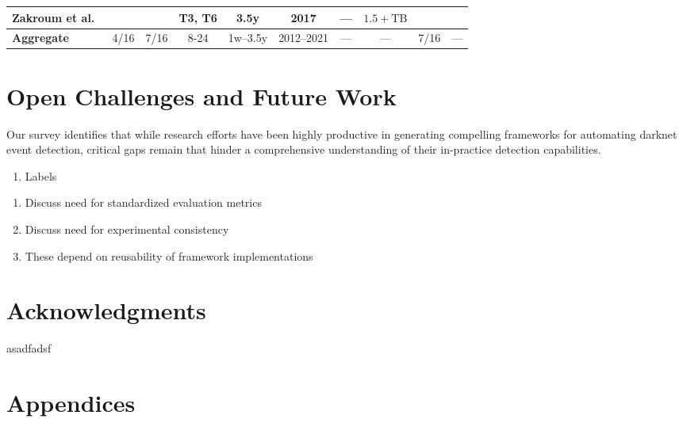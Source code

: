 \documentclass[manuscript,nonacm]{acmart}
\newcommand{\cmark}{\ding{51}}%
\newcommand{\xmark}{\ding{55}}%
\begin{document}
\begin{table*}[h!]
\begin{tabular}{@{}lccccccccc@{}}
		\textbf{Zakroum et al.~\cite{2022zakroum,2018zakroum}} 
		& \xmark & \cmark           
		& T3, T6    
		& 3.5y  & 2017    
		& ---                  
		& $1.5+\mathrm{TB}$ 
		& \cmark            
		& \xmark          \\
		
		\midrule
		\textbf{Aggregate}         
		& 4/16 & 7/16  & 8-24                  
		& 1w--3.5y & 2012--2021 
		& ---                  
		& ---              
		& 7/16          
		& ---              
		\\
		\bottomrule
	\end{tabular}
\end{table*}

\label{sec:fw}
\section{Open Challenges and Future Work}

Our survey identifies that while research efforts have been highly productive in generating compelling frameworks for automating darknet event detection, 
critical gaps remain that hinder a comprehensive understanding of their in-practice detection capabilities.

\begin{enumerate}
	\item Labels
\end{enumerate}

\begin{enumerate}
	\item Discuss need for standardized evaluation metrics
	\item Discuss need for experimental consistency
	\item These depend on reusability of framework implementations
\end{enumerate}

\section{Acknowledgments}
asadfadsf

\section{Appendices}
\end{document}
